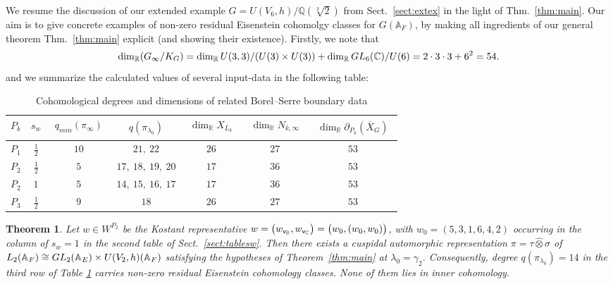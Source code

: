 \documentclass[10pt,a4paper]{amsart}
\newtheorem{thm}{Theorem}
\def\A{\mathbb A}
\def\C{\mathbb C}
\def\GL{{\rm GL}}
\def\Q{\mathbb Q}
\def\R{\mathbb R}
\def\vv{{\sf v}} %
\begin{document}
We resume the discussion of our extended example $G=U(V_6,h)/\Q(\sqrt[3]{2})$ from Sect.\ \ref{sect:extex} in the light of Thm.\ \ref{thm:main}. Our aim is to give concrete examples of non-zero residual Eisenstein cohomolgy classes for $G(\A_F)$, by making all ingredients of our general theorem Thm.\ \ref{thm:main} explicit (and showing their existence). Firstly, we note that
$$
\dim_\mathbb R(G_\infty/K_G)
=
\dim_\mathbb R U(3,3)/ (U(3)\times U(3))
+
\dim_\mathbb R \GL_6(\mathbb C)/U(6)
=
2\cdot 3\cdot 3+6^2
=
54.
$$
and we summarize the calculated values of several input-data in the following table:
\begin{table}[ht]
\centering
\small
\renewcommand{\arraystretch}{1.2}
\begin{tabular}{c|c|c|c|c|c|c}
\hline
\(P_k\)
&
\(s_w\)
&
\(\begin{array}{c} q_{min}(\pi_\infty) \end{array}\)
&
\(\begin{array}{c} q(\pi_{\lambda_0}) \end{array}\)
&
\(\begin{array}{c} \dim_\mathbb R X_{L_k} \end{array}\)
&
\(\begin{array}{c} \dim_\mathbb R N_{k,\infty} \end{array}\)
&
\(\begin{array}{c} \dim_\mathbb R \partial_{P_k}(\overline X_G) \end{array}\)
\\
\hline
\(P_1\) & \(\frac12\) & \(10\) & \(21,\ 22\)             & \(26\) & \(27\) & \(53\)\\
\(P_2\) & \(\frac12\) & \(5\)  & \(17,\ 18,\ 19,\ 20\)   & \(17\) & \(36\) & \(53\)\\
\(P_2\) & \(1\)       & \(5\)  & \(14,\ 15,\ 16,\ 17\)   & \(17\) & \(36\) & \(53\)\\
\(P_3\) & \(\frac12\) & \(9\)  & \(18\)                  & \(26\) & \(27\) & \(53\)\\
\hline
\end{tabular}
\caption{Cohomological degrees and dimensions of related Borel--Serre boundary data}
\label{tab:example-degrees-boundary}
\end{table}

\begin{thm}\label{prop:nonempty-P2-example}
Let $w\in W^{P_2}$ be the Kostant representative $w=
        \bigl(
        w_{\vv_\R},w_{\vv_\C}
        \bigr)
        =
        \bigl(
        w_0,(w_0,w_0)
        \bigr)$, with $w_0=(5,3,1,6,4,2)$
occurring in the column of \(s_w=1\) in the second table of Sect.\ \ref{sect:tablesw}. Then there
exists a cuspidal automorphic representation $\pi=\tau\widehat\otimes\sigma$ of $L_2(\mathbb A_F)
        \cong
        \GL_2(\mathbb A_E)\times U(V_2,h)(\mathbb A_F)$
satisfying the hypotheses of Theorem~\ref{thm:main} at $\lambda_0=\gamma_2.$
Consequently, degree $ q(\pi_{\lambda_0})
        = 14$ in the third row of Table \ref{tab:example-degrees-boundary} carries non-zero residual Eisenstein cohomology classes. None of them lies in inner cohomology.
\end{thm}
\end{document}
